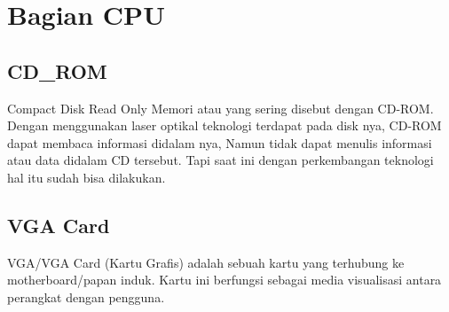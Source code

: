 \section{Bagian CPU}
\subsection{CD_ROM}
Compact Disk Read Only Memori atau yang sering disebut dengan CD-ROM. Dengan menggunakan laser optikal teknologi terdapat pada disk nya, CD-ROM dapat membaca informasi didalam nya, Namun
tidak dapat menulis informasi atau data didalam CD tersebut. Tapi saat ini dengan perkembangan teknologi hal itu sudah bisa dilakukan.
\subsection{VGA Card}
VGA/VGA Card (Kartu Grafis) adalah sebuah kartu yang terhubung ke motherboard/papan induk. Kartu ini berfungsi sebagai media visualisasi antara perangkat dengan pengguna.